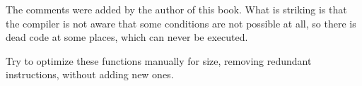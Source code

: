




The comments were added by the author of this book.
What is striking is that the compiler is not aware that some conditions are not possible at all,
so there is dead code at some places, which can never be executed.

\myparagraphold{\Exercise}

Try to optimize these functions manually for size, removing redundant instructions, without adding new ones.

